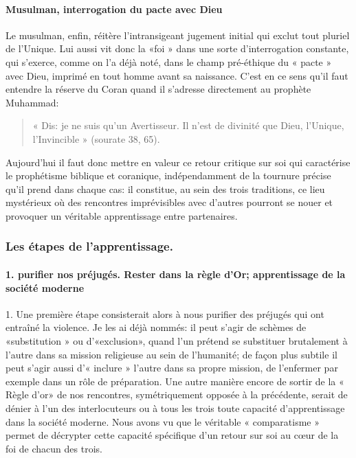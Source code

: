 \paragraph{Musulman, interrogation du pacte avec Dieu }
Le musulman, enfin, réitère l'intransigeant jugement initial qui exclut tout pluriel de l'Unique. Lui aussi vit donc la «foi » dans une sorte d'interrogation constante, qui s'exerce, comme on l'a déjà noté, dans le champ pré-éthique du « pacte » avec Dieu, imprimé en tout homme avant sa naissance. C'est en ce sens qu'il faut entendre la réserve du Coran quand il s'adresse directement au prophète Muhammad: 
\begin{quote}
    « Dis: je ne suis qu'un Avertisseur. Il n'est de divinité que Dieu, l'Unique, l'Invincible » (sourate 38, 65).
\end{quote}
Aujourd'hui il faut donc mettre en valeur ce retour critique sur soi qui caractérise le prophétisme biblique et coranique, indépendamment de la tournure précise qu'il prend dans chaque cas: il constitue, au sein des trois traditions, ce lieu mystérieux où des rencontres imprévisibles avec d'autres pourront se nouer et provoquer un véritable apprentissage entre partenaires.

\subsubsection{Les étapes de l'apprentissage.}

\paragraph{1. purifier nos préjugés. Rester dans la règle d'Or; apprentissage de la société moderne} 
1. Une première étape consisterait alors à nous purifier des préjugés qui ont entraîné la violence. Je les ai déjà nommés: il peut s'agir de schèmes de «substitution » ou d'«exclusion», quand l'un prétend se substituer brutalement à l'autre dans sa mission religieuse au sein de l'humanité; de façon plus subtile il peut s'agir aussi d'« inclure » l'autre dans sa propre mission, de l'enfermer par exemple dans un rôle de préparation. Une autre manière encore de sortir de la « Règle d'or» de nos rencontres, symétriquement opposée à la précédente, serait de dénier à l'un des interlocuteurs ou à tous les trois toute capacité d'apprentissage dans la société moderne. Nous avons vu que le véritable « comparatisme » permet de décrypter cette capacité spécifique d'un retour sur soi au cœur de la foi de chacun des trois.

